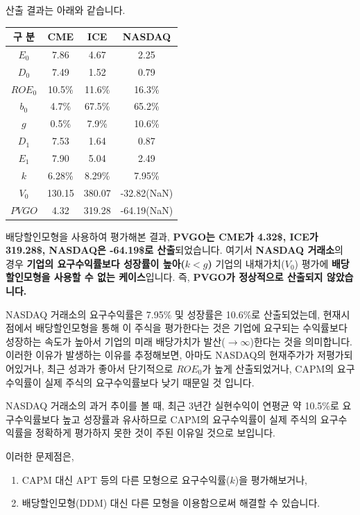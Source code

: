 \documentclass[
  a4paper,
  DIV=11,
  numbers=noendperiod]{scrreprt}
\begin{document}
산출 결과는 아래와 같습니다.

\begin{longtable}[]{@{}cccc@{}}
\toprule\noalign{}
구 분 & CME & ICE & NASDAQ \\
\midrule\noalign{}
\endhead
\bottomrule\noalign{}
\endlastfoot
\(E_0\) & 7.86 & 4.67 & 2.25 \\
\(D_0\) & 7.49 & 1.52 & 0.79 \\
\(ROE_0\) & 10.5\% & 11.6\% & 16.3\% \\
\(b_0\) & 4.7\% & 67.5\% & 65.2\% \\
\(g\) & 0.5\% & 7.9\% & 10.6\% \\
\(D_1\) & 7.53 & 1.64 & 0.87 \\
\(E_1\) & 7.90 & 5.04 & 2.49 \\
\(k\) & 6.28\% & 8.29\% & 7.95\% \\
\(V_0\) & 130.15 & 380.07 & -32.82(NaN) \\
\(PVGO\) & 4.32 & 319.28 & -64.19(NaN) \\
\end{longtable}

배당할인모형을 사용하여 평가해본 결과, \textbf{PVGO는 CME가 4.32\$,
ICE가 319.28\$, NASDAQ은 -64.19\$로 산출}되었습니다. 여기서
\textbf{NASDAQ 거래소}의 경우 \textbf{기업의 요구수익률보다 성장률이
높아(\(k<g\))} 기업의 내채가치(\(V_0\)) 평가에 \textbf{배당할인모형을
사용할 수 없는 케이스}입니다. 즉, \textbf{PVGO가 정상적으로 산출되지
않았습니다.}

NASDAQ 거래소의 요구수익률은 7.95\% 및 성장률은 10.6\%로 산출되었는데,
현재시점에서 배당할인모형을 통해 이 주식을 평가한다는 것은 기업에
요구되는 수익률보다 성장하는 속도가 높아서 기업의 미래 배당가치가
발산(\(\rightarrow\infty\))한다는 것을 의미합니다. 이러한 이유가
발생하는 이유를 추정해보면, 아마도 NASDAQ의 현재주가가 저평가되어있거나,
최근 성과가 좋아서 단기적으로 \(ROE_0\)가 높게 산출되었거나, CAPM의
요구수익률이 실제 주식의 요구수익률보다 낮기 때문일 것 입니다.

NASDAQ 거래소의 과거 추이를 볼 때, 최근 3년간 실현수익이 연평균 약
10.5\%로 요구수익률보다 높고 성장률과 유사하므로 CAPM의 요구수익률이
실제 주식의 요구수익률을 정확하게 평가하지 못한 것이 주된 이유일 것으로
보입니다.

이러한 문제점은,

\begin{enumerate}
\def\labelenumi{(\arabic{enumi})}
\item
  CAPM 대신 APT 등의 다른 모형으로 요구수익률(\(k\))을 평가해보거나,
\item
  배당할인모형(DDM) 대신 다른 모형을 이용함으로써 해결할 수 있습니다.
\end{enumerate}
\end{document}
